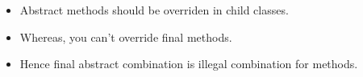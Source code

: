 \setlength{\columnsep}{3pt}
\begin{flushleft}
	
	\begin{itemize}
		\item Abstract methods should be overriden in child classes.
		\item Whereas, you can’t override final methods. 
		\item Hence final abstract combination is illegal combination for methods.
	\end{itemize}	
	
\end{flushleft}

\newpage

